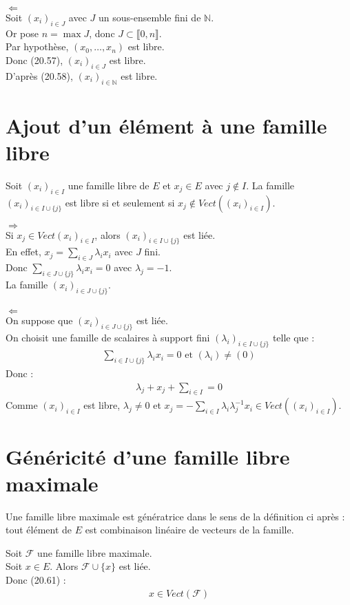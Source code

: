 \documentclass[../main.tex]{subfiles}
\begin{document}
$\boxed{\Leftarrow}$ \\
Soit $(x_i)_{i\in J}$ avec $J$ un sous-ensemble fini de $\mathbb{N}$. \\
Or pose $n = \max J$, donc $J \subset \llbracket 0, n \rrbracket$. \\
Par hypothèse, $(x_0, \ldots, x_n)$ est libre. \\
Donc (20.57), $(x_i)_{i\in J}$ est libre. \\
D'après (20.58), $(x_i)_{i\in \mathbb{N}}$ est libre. 

\section{Ajout d'un élément à une famille libre}
\begin{tcolorbox}[title=Propostion 20.61, title filled=false, colframe=lightblue, colback=lightblue!10!white]
    Soit $(x_i)_{i\in I}$ une famille libre de $E$ et $x_j \in E$ avec $j \not\in I$. La famille $(x_i)_{i\in I \cup \{j\}}$ est libre si et seulement si $x_j \not\in Vect((x_i)_{i\in I})$. 
\end{tcolorbox}

$\boxed{\Rightarrow}$ \\
Si $x_j \in Vect(x_i)_{i\in I}$, alors $(x_i)_{i\in I \cup \{j\}}$ est liée. \\
En effet, $x_j = \sum\limits_{i\in J} \lambda_i x_i$ avec $J$ fini. \\
Donc $\sum\limits_{i \in J\cup \{j\}} \lambda_i x_i = 0$ avec $\lambda_j = -1$. \\
La famille $(x_i)_{i\in J \cup \{j\}}$. \\ \\

$\boxed{\Leftarrow}$ \\
On suppose que $(x_i)_{i\in J \cup \{j\}}$ est liée. \\
On choisit une famille de scalaires à support fini $(\lambda_i)_{i\in I \cup \{j\}}$ telle que : 
\begin{align*}
    \sum_{i \in I \cup \{j\}} \lambda_i x_i = 0 \text{ et } (\lambda_i) \neq (0) 
\end{align*}
Donc : 
\begin{align*}
    \lambda_j + x_j + \sum_{i\in I} = 0 
\end{align*}
Comme $(x_i)_{i\in I}$ est libre, $\lambda_j \neq 0$ et $x_j = -\sum\limits_{i\in I} \lambda_i \lambda_j^{-1} x_i \in Vect((x_i)_{i\in I})$. 

\section{Généricité d'une famille libre maximale}
\begin{tcolorbox}[title=Propostion 20.63, title filled=false, colframe=lightblue, colback=lightblue!10!white]
    Une famille libre maximale est génératrice dans le sens de la définition ci après : tout élément de $E$ est combinaison linéaire de vecteurs de la famille. 
\end{tcolorbox}

\noindent Soit $\mathcal{F}$ une famille libre maximale. \\
Soit $x\in E$. Alors $\mathcal{F} \cup \{x\}$ est liée. \\
Donc (20.61) : 
\begin{align*}
    x \in Vect(\mathcal{F})
\end{align*}
\end{document}
